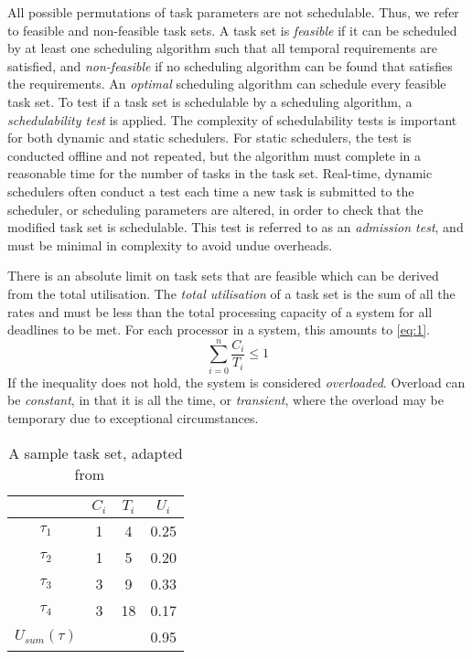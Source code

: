 All possible permutations of task parameters are not schedulable.
Thus, we refer to feasible and non-feasible task sets. 
A task set is \emph{feasible} if it can be scheduled by at least one scheduling algorithm such that
all temporal requirements are satisfied, and \emph{non-feasible} if no scheduling algorithm can be found
that satisfies the requirements.
An \emph{optimal} scheduling algorithm can schedule every feasible task set.
To test if a task set is schedulable by a scheduling algorithm, a \emph{schedulability test} is applied.
The complexity of schedulability tests is important for both dynamic and static schedulers. For
static schedulers, the test is conducted offline and not repeated, but the algorithm must complete
in a reasonable time for the number of tasks in the task set. Real-time, dynamic schedulers often conduct a
test each time a new task is submitted to the scheduler, or scheduling parameters are
altered, in order to check that the modified task set is schedulable. This test is referred to as an 
\emph{admission test}, and must be minimal in complexity to avoid undue overheads. 

There is an absolute limit on task sets that are feasible which can be derived from the total
utilisation. 
The \emph{total utilisation} of a task set is the sum of all the rates and must be less than the
total processing capacity of a system for all deadlines to be met.
For each processor in a system, this amounts to \cref{eq:1}.
\begin{equation}
    \label{eq:1}
	\sum\limits_{i=0}^n \dfrac{C_{i}}{T_{i}} \leq 1
\end{equation}
If the inequality does not hold, the system is considered \emph{overloaded}. Overload
can be \emph{constant}, in that it is all the time, or \emph{transient}, where the overload may be
temporary due to exceptional circumstances.

\begin{table}
    \centering
    \begin{tabular}{cccc} \toprule
        & \emph{$C_{i}$} & $T_{i}$ & $U_{i} $ \\ \midrule
			$ \tau_{1}$ & 1 & 4 & 0.25 \\
			$ \tau_{2}$ & 1 & 5 & 0.20 \\
			$ \tau_{3}$ & 3 & 9 & 0.33 \\
			$ \tau_{4}$ & 3 & 18 & 0.17  \\\midrule 
	$ U_{sum}(\tau)$ & &  & 0.95 \\ \bottomrule
	\end{tabular}
    \caption[A sample task set.]{A sample task set, adapted from ~\citep{Brandenburg:phd}}
	\label{tab:example_task_set}
\end{table}

